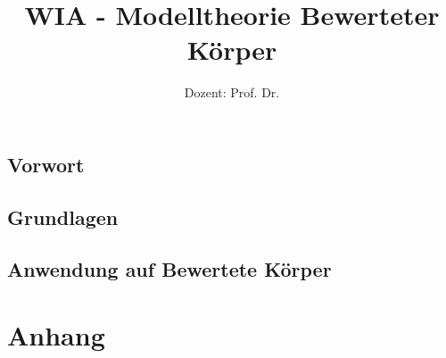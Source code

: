 \documentclass[ngerman,a4paper,order=firstname]{mathscript}
\title{\textbf{WIA - Modelltheorie Bewerteter Körper}}
\author{Dozent: Prof. Dr. \person{Arno Fehm}}
\begin{document}
\pagestyle{plain}

\maketitle

\hypertarget{tocpage}{}
\tableofcontents
{}

\pagebreak
{}
\pagestyle{fancy}

\chapter*{Vorwort}

\chapter{Grundlagen}



\chapter{Anwendung auf Bewertete Körper}

\part*{Anhang}
\appendix

\nocite{*}
%



\printindex
\end{document}
